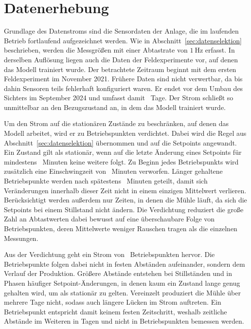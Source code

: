 \section{Datenerhebung} \label{sec:mill_data}
%

%
Grundlage des Datenstroms sind die Sensordaten der Anlage, die im laufenden Betrieb fortlaufend aufgezeichnet werden. Wie in Abschnitt~\ref{sec:datenselektion} beschrieben, werden die Messgrößen mit einer Abtastrate von $\SI{1}{\hertz}$ erfasst. In derselben Auflösung liegen auch die Daten der Feldexperimente vor, auf denen das Modell trainiert wurde. Der betrachtete Zeitraum beginnt mit dem ersten Feldexperiment im November 2021. Frühere Daten sind nicht verwertbar, da bis dahin Sensoren teils fehlerhaft konfiguriert waren. Er endet vor dem Umbau des Sichters im September 2024 und umfasst damit \millSpanDays~Tage. Der Strom schließt so unmittelbar an den Bezugszustand an, in dem das Modell trainiert wurde. \par
%
Um den Strom auf die stationären Zustände zu beschränken, auf denen das Modell arbeitet, wird er zu Betriebspunkten verdichtet. Dabei wird die Regel aus Abschnitt~\ref{sec:datenselektion} übernommen und auf die Setpoints angewandt. Ein Zustand gilt als stationär, wenn auf die letzte Änderung eines Setpoints für mindestens \millAggMinHoldMin~Minuten keine weitere folgt. Zu Beginn jedes Betriebspunkts wird zusätzlich eine Einschwingzeit von \millAggSettleMin~Minuten verworfen. Länger gehaltene Betriebspunkte werden nach spätestens \millAggMaxHoldMin~Minuten geteilt, damit sich Veränderungen innerhalb dieser Zeit nicht in einem einzigen Mittelwert verlieren. Berücksichtigt werden außerdem nur Zeiten, in denen die Mühle läuft, da sich die Setpoints bei einem Stillstand nicht ändern. Die Verdichtung reduziert die große Zahl an Abtastwerten dabei bewusst auf eine überschaubare Folge von Betriebspunkten, deren Mittelwerte weniger Rauschen tragen als die einzelnen Messungen. \par
%
Aus der Verdichtung geht ein Strom von \millNPoints~Betriebspunkten hervor. Die Betriebspunkte folgen dabei nicht in festen Abständen aufeinander, sondern dem Verlauf der Produktion. Größere Abstände entstehen bei Stillständen und in Phasen häufiger Setpoint-Änderungen, in denen kaum ein Zustand lange genug gehalten wird, um als stationär zu gelten. Vereinzelt produziert die Mühle über mehrere Tage nicht, sodass auch längere Lücken im Strom auftreten. Ein Betriebspunkt entspricht damit keinem festen Zeitschritt, weshalb zeitliche Abstände im Weiteren in Tagen und nicht in Betriebspunkten bemessen werden. \par
